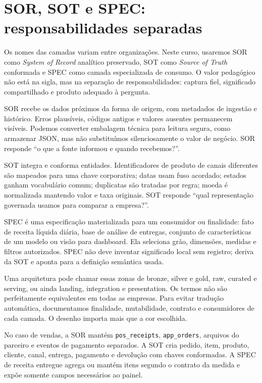 \section{SOR, SOT e SPEC: responsabilidades separadas}

Os nomes das camadas variam entre organizações. Neste curso, usaremos SOR como \textit{System of Record} analítico preservado, SOT como \textit{Source of Truth} conformada e SPEC como camada especializada de consumo. O valor pedagógico não está na sigla, mas na separação de responsabilidades: captura fiel, significado compartilhado e produto adequado à pergunta.

SOR recebe os dados próximos da forma de origem, com metadados de ingestão e histórico. Erros plausíveis, códigos antigos e valores ausentes permanecem visíveis. Podemos converter embalagem técnica para leitura segura, como armazenar JSON, mas não substituímos silenciosamente o valor de negócio. SOR responde ``o que a fonte informou e quando recebemos?''.

SOT integra e conforma entidades. Identificadores de produto de canais diferentes são mapeados para uma chave corporativa; datas usam fuso acordado; estados ganham vocabulário comum; duplicatas são tratadas por regra; moeda é normalizada mantendo valor e taxa originais. SOT responde ``qual representação governada usamos para comparar a empresa?''.

SPEC é uma especificação materializada para um consumidor ou finalidade: fato de receita líquida diária, base de análise de entregas, conjunto de características de um modelo ou visão para dashboard. Ela seleciona grão, dimensões, medidas e filtros autorizados. SPEC não deve inventar significado local sem registro; deriva da SOT e aponta para a definição semântica usada.

Uma arquitetura pode chamar essas zonas de bronze, silver e gold, raw, curated e serving, ou ainda landing, integration e presentation. Os termos não são perfeitamente equivalentes em todas as empresas. Para evitar tradução automática, documentamos finalidade, mutabilidade, contrato e consumidores de cada camada. O desenho importa mais que a cor escolhida.

No caso de vendas, a SOR mantém \texttt{pos\_receipts}, \texttt{app\_orders}, arquivos do parceiro e eventos de pagamento separados. A SOT cria pedido, item, produto, cliente, canal, entrega, pagamento e devolução com chaves conformadas. A SPEC de receita entregue agrega ou mantém itens segundo o contrato da medida e expõe somente campos necessários ao painel.

